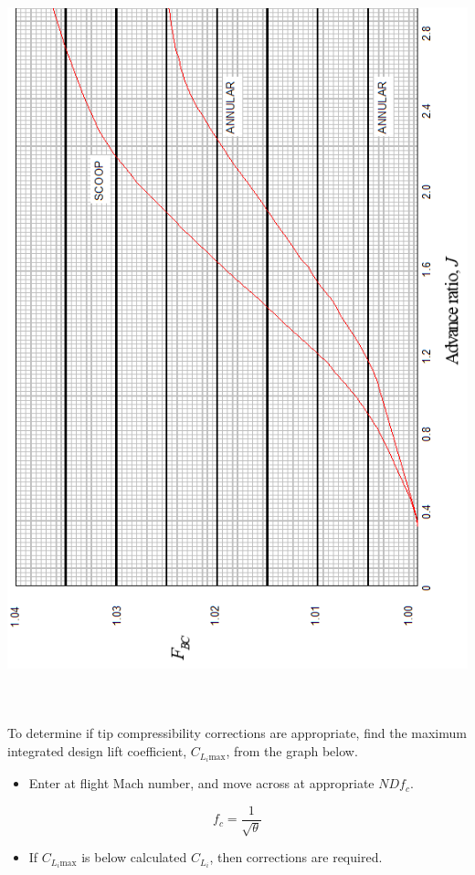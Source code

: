 \documentclass[
]{book}
\providecommand{\tightlist}{%
  \setlength{\itemsep}{0pt}\setlength{\parskip}{0pt}}
\begin{document}
\includegraphics[width=5.87431in,height=8.43611in]{media/11/image26.png}

To determine if tip compressibility corrections are appropriate, find the maximum integrated design lift coefficient, \(C_{L_i \text{max}}\), from the graph below.

\begin{itemize}
\tightlist
\item
  Enter at flight Mach number, and move across at appropriate \(NDf_c\).
\end{itemize}

\[
f_c = \frac{1}{\sqrt{\theta}}
\]

\begin{itemize}
\tightlist
\item
  If \(C_{L_i \text{max}}\) is below calculated \(C_{L_i}\), then corrections are required.
\end{itemize}
\end{document}
